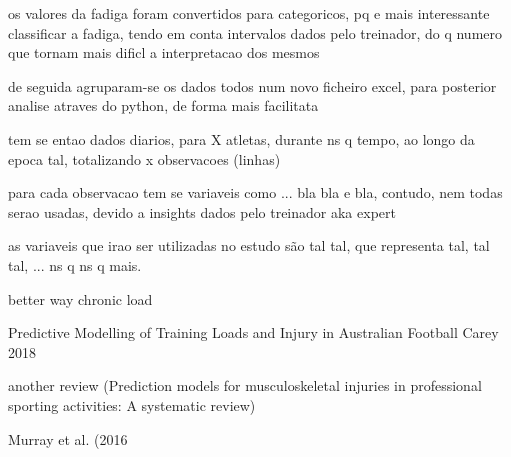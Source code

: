 \documentclass[conference]{IEEEtran}
\begin{document}
os valores da fadiga foram convertidos para categoricos, pq e mais interessante classificar a fadiga, tendo em conta intervalos dados pelo treinador, do q numero que tornam mais dificl a interpretacao dos mesmos

de seguida agruparam-se os dados todos num novo ficheiro excel, para posterior analise atraves do python, de forma mais facilitata

tem se entao dados diarios, para X atletas, durante ns q tempo, ao longo da epoca tal, totalizando x observacoes (linhas)

para cada observacao tem se variaveis como ... bla bla e bla, contudo, nem todas serao usadas, devido a insights dados pelo treinador aka expert

as variaveis que irao ser utilizadas no estudo são tal tal, que representa tal, tal tal, ... ns q ns q mais.

\cite{Williams17} better way chronic load

\cite{Carey_2018} Predictive Modelling of Training Loads and Injury in Australian Football Carey 2018

\cite{Seow20} another review (Prediction models for musculoskeletal injuries in professional sporting activities: A systematic review)

\cite{Murray16} Murray et al. (2016







\end{document}
